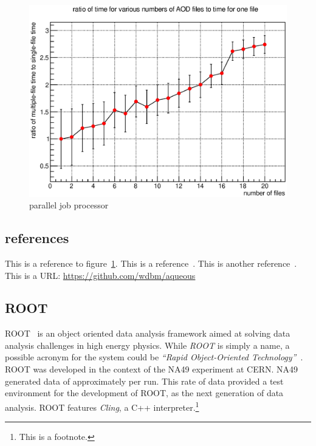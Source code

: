 \begin{figure}[H]
\begin{center}
\includegraphics[width=\textwidth]{images/2014-04-10_2.eps}
\end{center}
\caption{parallel job processor}
\label{figure:PJP_1}
\end{figure}

\subsection{references}

This is a reference to figure~\ref{figure:PJP_1}. This is a reference~\cite{Tianjun_1}. This is another reference~\cite{McCulloch_Pitts_1}. This is a URL: \href{https://github.com/wdbm/aqueous}{\textcolor{black!100}{https://github.com/wdbm/aqueous}}


\subsection{ROOT}

ROOT~\cite{ROOT} is an object oriented data analysis framework aimed at solving data analysis challenges in high energy physics. While \emph{ROOT} is simply a name, a possible acronym for the system could be \emph{``Rapid Object-Oriented Technology''}~\cite{ROOT_acronym}. ROOT was developed in the context of the NA49 experiment at CERN. NA49 generated data of approximately  per run. This rate of data provided a test environment for the development of ROOT, as the next generation of data analysis. ROOT features \emph{Cling}, a C++ interpreter.\footnote{This is a footnote.}

